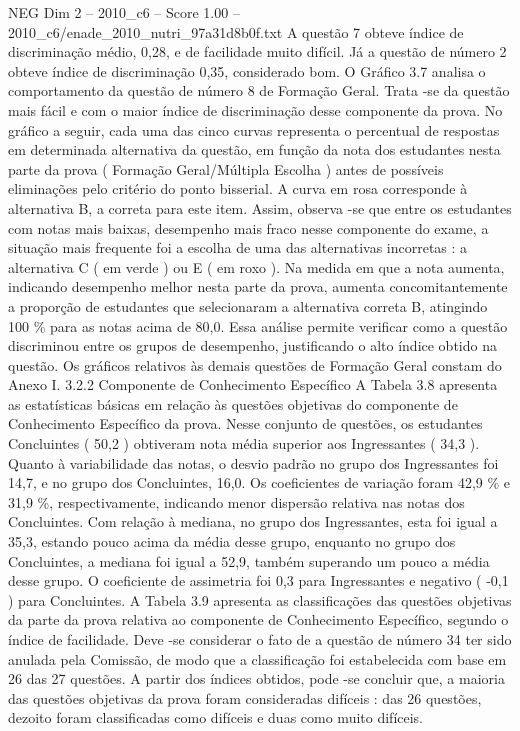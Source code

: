 \begin{textsample}{NEG Dim 2 – 2010\_c6 – Score 1.00 – 2010\_c6/enade\_2010\_nutri\_97a31d8b0f.txt}
A questão 7 obteve índice de discriminação médio, 0,28, e de facilidade muito difícil.
Já a questão de número 2 obteve índice de discriminação 0,35, considerado bom.
O Gráfico 3.7 analisa o comportamento da questão de número 8 de Formação Geral.
Trata -se da questão mais fácil e com o maior índice de discriminação desse componente da prova.
No gráfico a seguir, cada uma das cinco curvas representa o percentual de respostas em determinada alternativa da questão, em função da nota dos estudantes nesta parte da prova ( Formação Geral/Múltipla Escolha ) antes de possíveis eliminações pelo critério do ponto bisserial.
A curva em rosa corresponde à alternativa B, a correta para este item.
Assim, observa -se que entre os estudantes com notas mais baixas, desempenho mais fraco nesse componente do exame, a situação mais frequente foi a escolha de uma das alternativas incorretas : a alternativa C ( em verde ) ou E ( em roxo ).
Na medida em que a nota aumenta, indicando desempenho melhor nesta parte da prova, aumenta concomitantemente a proporção de estudantes que selecionaram a alternativa correta B, atingindo 100 \% para as notas acima de 80,0.
Essa análise permite verificar como a questão discriminou entre os grupos de desempenho, justificando o alto índice obtido na questão.
Os gráficos relativos às demais questões de Formação Geral constam do Anexo I. 3.2.2 Componente de Conhecimento Específico A Tabela 3.8 apresenta as estatísticas básicas em relação às questões objetivas do componente de Conhecimento Específico da prova.
Nesse conjunto de questões, os estudantes Concluintes ( 50,2 ) obtiveram nota média superior aos Ingressantes ( 34,3 ).
Quanto à variabilidade das notas, o desvio padrão no grupo dos Ingressantes foi 14,7, e no grupo dos Concluintes, 16,0.
Os coeficientes de variação foram 42,9 \% e 31,9 \%, respectivamente, indicando menor dispersão relativa nas notas dos Concluintes.
Com relação à mediana, no grupo dos Ingressantes, esta foi igual a 35,3, estando pouco acima da média desse grupo, enquanto no grupo dos Concluintes, a mediana foi igual a 52,9, também superando um pouco a média desse grupo.
O coeficiente de assimetria foi 0,3 para Ingressantes e negativo ( -0,1 ) para Concluintes.
A Tabela 3.9 apresenta as classificações das questões objetivas da parte da prova relativa ao componente de Conhecimento Específico, segundo o índice de facilidade.
Deve -se considerar o fato de a questão de número 34 ter sido anulada pela Comissão, de modo que a classificação foi estabelecida com base em 26 das 27 questões.
A partir dos índices obtidos, pode -se concluir que, a maioria das questões objetivas da prova foram consideradas difíceis : das 26 questões, dezoito foram classificadas como difíceis e duas como muito difíceis.

\end{textsample}
